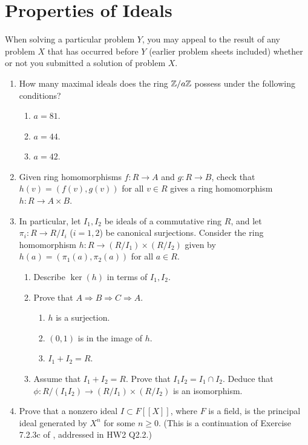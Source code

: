 \documentclass[../psets.tex]{subfiles}
\begin{document}
\section{Properties of Ideals}
When solving a particular problem $Y$, you may appeal to the result of any problem $X$ that has occurred before $Y$ (earlier problem sheets included) whether or not you submitted a solution of problem $X$.
\begin{enumerate}
    \item {}How many maximal ideals does the ring $\mathbb{Z}/a\mathbb{Z}$ possess under the following conditions?
    \begin{enumerate}[label={(\roman*)}]
        \item $a=81$.
        \item $a=44$.
        \item $a=42$.
    \end{enumerate}
    \item Given ring homomorphisms $f:R\to A$ and $g:R\to B$, check that $h(v)=(f(v),g(v))$ for all $v\in R$ gives a ring homomorphism $h:R\to A\times B$.
    \item In particular, let $I_1,I_2$ be ideals of a commutative ring $R$, and let $\pi_i:R\to R/I_i$ ($i=1,2$) be canonical surjections. Consider the ring homomorphism $h:R\to(R/I_1)\times(R/I_2)$ given by $h(a)=(\pi_1(a),\pi_2(a))$ for all $a\in R$.
    \begin{enumerate}[label={(\roman*)}]
        \item Describe $\ker(h)$ in terms of $I_1,I_2$.
        \item Prove that $A\Longrightarrow B\Longrightarrow C\Longrightarrow A$.
        \begin{enumerate}[label={(\Alph*)}]
            \item $h$ is a surjection.
            \item $(0,1)$ is in the image of $h$.
            \item $I_1+I_2=R$.
        \end{enumerate}
        \item Assume that $I_1+I_2=R$. Prove that $I_1I_2=I_1\cap I_2$. Deduce that $\phi:R/(I_1I_2)\to(R/I_1)\times(R/I_2)$ is an isomorphism.
    \end{enumerate}
    \item Prove that a nonzero ideal $I\subset F[[X]]$, where $F$ is a field, is the principal ideal generated by $X^n$ for some $n\geq 0$. (This is a continuation of Exercise 7.2.3c of \textcite{bib:DummitFoote}, addressed in HW2 Q2.2.)

\end{enumerate}
\end{document}
